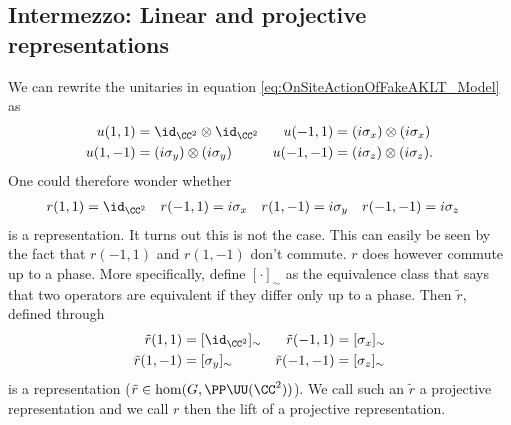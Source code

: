 \subsection{Intermezzo: Linear and projective representations}
We can rewrite the unitaries in equation \eqref{eq:OnSiteActionOfFakeAKLT_Model} as
\begin{align}\label{eq:OnSiteActionOfFakeAKLT_Model_Rewritten}
u(1,1)&=\id_{\CC^2}\otimes\id_{\CC^2}&u(-1,1)&=(i\sigma_x)\otimes(i\sigma_x)\\
\nonumber
u(1,-1)&=(i\sigma_y)\otimes(i\sigma_y)&u(-1,-1)&=(i\sigma_z)\otimes(i\sigma_z).
\end{align}
One could therefore wonder whether
\begin{align}\label{eq:OnSiteActionOfFakeAKLT_Model_OnC2}
r(1,1)&=\id_{\CC^2}&r(-1,1)&=i\sigma_x&r(1,-1)&=i\sigma_y&r(-1,-1)&=i\sigma_z
\end{align}
is a representation. It turns out this is not the case. This can easily be seen by the fact that $r(-1,1)$ and $r(1,-1)$ don't commute. $r$ does however commute up to a phase. More specifically, define $[\cdot]_\sim$ as the equivalence class that says that two operators are equivalent if they differ only up to a phase. Then $\tilde{r}$, defined through
\begin{align}\label{eq:OnSiteActionOfFakeAKLT_Model_OnC2_ProjectiveRep}
\tilde r(1,1)&=[\id_{\CC^2}]_\sim&\tilde r(-1,1)&=[\sigma_x]_\sim\\
\nonumber
\tilde r(1,-1)&=[\sigma_y]_\sim&\tilde r(-1,-1)&=[\sigma_z]_\sim
\end{align}
is a representation ($\tilde{r}\in\hom(G,\PP\UU(\CC^2))$). We call such an $\tilde{r}$ a projective representation and we call $r$ then the lift of a projective representation.
